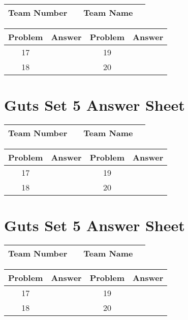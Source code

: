 \documentclass[14pt]{article}
\begin{document}
\begin{center}
\begin{tabular}{|r|r|r|r|}
\hline
	Team Number & \hspace{10em} &
	Team Name & \hspace{15em} \\ \hline
\end{tabular}
\end{center}
\begin{tabularx}{\textwidth}{|c|l|c|X|}\hline
	Problem & Answer & Problem & Answer \\\hline
	17 & \hspace{15em} & 19 & \\\hline
	18 & & 20 & \\\hline
\end{tabularx}

\vspace{30px}

\section*{Guts Set 5 Answer Sheet}

\begin{center}
\begin{tabular}{|r|r|r|r|}
\hline
	Team Number & \hspace{10em} &
	Team Name & \hspace{15em} \\ \hline
\end{tabular}
\end{center}
\begin{tabularx}{\textwidth}{|c|l|c|X|}\hline
	Problem & Answer & Problem & Answer \\\hline
	17 & \hspace{15em} & 19 & \\\hline
	18 & & 20 & \\\hline
\end{tabularx}

\vspace{30px}

\section*{Guts Set 5 Answer Sheet}

\begin{center}
\begin{tabular}{|r|r|r|r|}
\hline
	Team Number & \hspace{10em} &
	Team Name & \hspace{15em} \\ \hline
\end{tabular}
\end{center}
\begin{tabularx}{\textwidth}{|c|l|c|X|}\hline
	Problem & Answer & Problem & Answer \\\hline
	17 & \hspace{15em} & 19 & \\\hline
	18 & & 20 & \\\hline
\end{tabularx}
\end{document}

